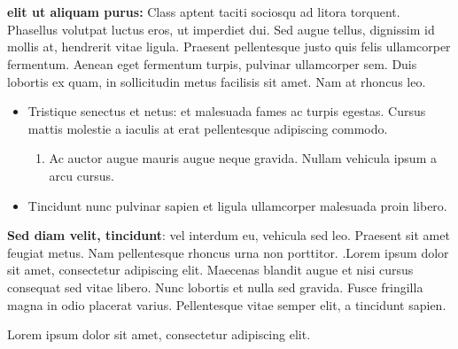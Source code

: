 \documentclass[11pt,a4paper]{report}
\begin{document}
\begin{minipage}[t]{.4\linewidth} %
    \noindent
    \chapter{}
    {\bf elit ut aliquam purus:} Class aptent taciti sociosqu ad litora torquent.
    Phasellus volutpat luctus eros, ut imperdiet dui. 
    Sed augue tellus, dignissim id mollis at, hendrerit vitae ligula. 
    Praesent pellentesque justo quis felis ullamcorper fermentum. 
    Aenean eget fermentum turpis, pulvinar ullamcorper sem. 
    Duis lobortis ex quam, in sollicitudin metus facilisis sit amet. Nam at rhoncus leo.
    \vspace{10pt}
    \begin{itemize}
        \item Tristique senectus et netus: et malesuada fames ac turpis egestas.\linebreak
        Cursus mattis molestie a iaculis at erat pellentesque adipiscing commodo.
        \begin{enumerate}
            \item Ac auctor augue mauris augue neque gravida. Nullam vehicula ipsum a arcu cursus.
        \end{enumerate}
        \item Tincidunt nunc pulvinar sapien et ligula ullamcorper malesuada proin libero.
    \end{itemize}
    \vspace{5pt}
    
    {\bf\large Sed diam velit, tincidunt}: vel interdum eu, vehicula sed leo. 
    Praesent sit amet feugiat metus. Nam pellentesque rhoncus urna non porttitor. 
    .Lorem ipsum dolor sit amet, consectetur adipiscing elit. 
    Maecenas blandit augue et nisi cursus consequat sed vitae libero. 
    Nunc lobortis et nulla sed gravida. Fusce fringilla magna in odio placerat varius. 
    Pellentesque vitae semper elit, a tincidunt sapien.\linebreak
    \begin{center}
    Lorem ipsum dolor sit amet, consectetur adipiscing elit.
    \end{center}
    
    \end{minipage}
\end{document}
